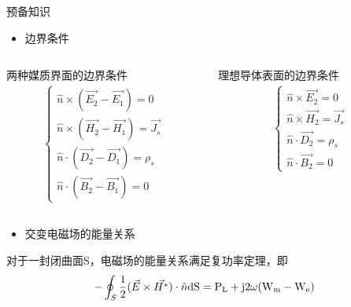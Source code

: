 \begin{frame}{预备知识}
    \begin{itemize}
        \item 边界条件
    \end{itemize}
    \begin{columns}
        \begin{column}{0.5\linewidth}
            两种媒质界面的边界条件
            \begin{align*}
                \begin{cases}
                    \hat{n}\times(\vec{E_2}-\vec{E_1})=0\\
                    \hat{n}\times(\vec{H_2}-\vec{H_1})=\vec{J_s}\\
                    \hat{n}\cdot(\vec{D_2}-\vec{D_1})=\rho_s\\
                    \hat{n}\cdot(\vec{B_2}-\vec{B_1})=0
                \end{cases}
            \end{align*}
        \end{column}
        \begin{column}{0.5\linewidth}
            理想导体表面的边界条件
            \begin{align*}
                \begin{cases}
                    \hat{n}\times\vec{E_2}=0\\
                    \hat{n}\times\vec{H_2}=\vec{J_s}\\
                    \hat{n}\cdot\vec{D_2}=\rho_s\\
                    \hat{n}\cdot\vec{B_2}=0
                \end{cases}
            \end{align*}
        \end{column}
    \end{columns}
\end{frame}

\begin{frame}
    \begin{itemize}
        \item 交变电磁场的能量关系
    \end{itemize}
    对于一封闭曲面S，电磁场的能量关系满足复功率定理，即
    \begin{align*}
        -\oint_S\frac{1}{2}(\vec{E}\times\vec{H^*})\cdot\hat{n}\rm{d}S=P_L+\rm{j}2\omega(W_m-W_e)
    \end{align*}
\end{frame}

